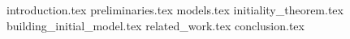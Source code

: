 {introduction.tex}
{preliminaries.tex}
%
{models.tex}
{initiality_theorem.tex}
{building_initial_model.tex}
%
%
%
{related_work.tex}
{conclusion.tex}
%
%
%
%

